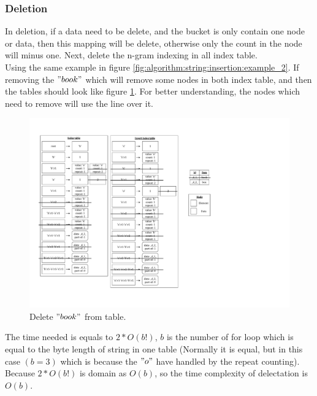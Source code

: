 \subsubsection{Deletion}

In deletion, if a data need to be delete, and the bucket is only contain one node or data, then this mapping will be delete, otherwise only the count in the node will minus one. Next, delete the n-gram indexing in all index table.\\

Using the same example in figure \ref{fig:algorithm:string:insertion:example_2}. If removing the $"book"$ which will remove some nodes in both index table, and then the tables should look like figure \ref{fig:algorithm:string:deletion:example_1}. For better understanding, the nodes which need to remove will use the line over it.

\begin{figure}[h]
\centering
\includegraphics[scale=0.4]{./algorithm/string/pic/deletion/example_1_v3.pdf}
\caption{Delete $"book"$ from table.}
\label{fig:algorithm:string:deletion:example_1}
\end{figure}

The time needed is equals to $2 * O(b!)$, $b$ is the number of for loop which is equal to the byte length of string in one table (Normally it is equal, but in this case $(b = 3)$ which is because the $"o"$ have handled by the repeat counting). Because $2 * O(b!)$ is domain as $O(b)$, so the time complexity of delectation is $O(b)$.

